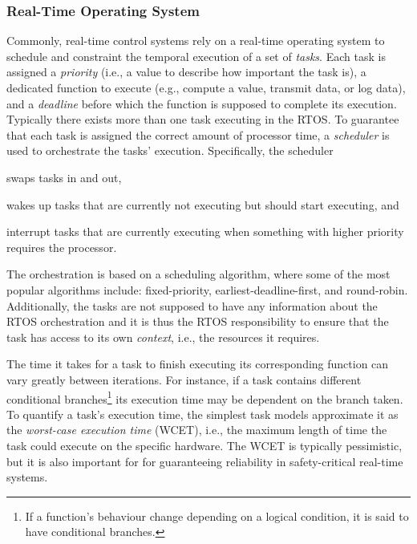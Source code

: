 \subsubsection{Real-Time Operating System}%
%
Commonly, real-time control systems rely on a real-time operating system to schedule and constraint the temporal execution of a set of \emph{tasks}.
Each task is assigned a \emph{priority} (i.e., a value to describe how important the task is), a dedicated function to execute (e.g., compute a value, transmit data, or log data), and a \emph{deadline} before which the function is supposed to complete its execution.
Typically there exists more than one task executing in the RTOS.
To guarantee that each task is assigned the correct amount of processor time, a \emph{scheduler} is used to orchestrate the tasks' execution.
Specifically, the scheduler
\begin{enumerate*}[label = (\roman*)]
    \item swaps tasks in and out,
    \item wakes up tasks that are currently not executing but should start executing, and
    \item interrupt tasks that are currently executing when something with higher priority requires the processor.
\end{enumerate*}
The orchestration is based on a scheduling algorithm, where some of the most popular algorithms include: fixed-priority, earliest-deadline-first, and round-robin.
Additionally, the tasks are not supposed to have any information about the RTOS orchestration and it is thus the RTOS responsibility to ensure that the task has access to its own \emph{context}, i.e., the resources it requires. 

The time it takes for a task to finish executing its corresponding function can vary greatly between iterations.
For instance, if a task contains different conditional branches\footnote{If a function's behaviour change depending on a logical condition, it is said to have conditional branches.} its execution time may be dependent on the branch taken.
To quantify a task's execution time, the simplest task models approximate it as the \emph{worst-case execution time} (WCET), i.e., the maximum length of time the task could execute on the specific hardware.
The WCET is typically pessimistic, but it is also important for for guaranteeing reliability in safety-critical real-time systems.

